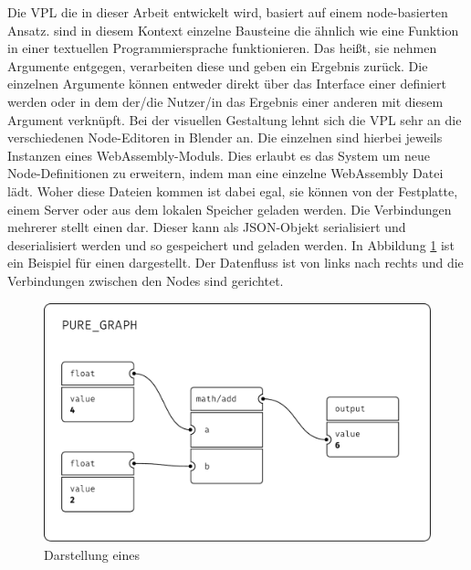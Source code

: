 \documentclass[ngerman]{article}
\begin{document}
Die VPL die in dieser Arbeit entwickelt wird, basiert auf einem node-basierten Ansatz. 
 sind in diesem Kontext einzelne Bausteine die ähnlich wie eine Funktion in einer textuellen Programmiersprache funktionieren.
Das heißt, sie nehmen Argumente entgegen, verarbeiten diese und geben ein Ergebnis zurück.
\br
Die einzelnen Argumente können entweder direkt über das Interface einer  definiert werden oder in dem der/die Nutzer/in das Ergebnis einer anderen  mit diesem Argument verknüpft.
Bei der visuellen Gestaltung lehnt sich die VPL sehr an die verschiedenen Node-Editoren in Blender an.
\br
Die einzelnen  sind hierbei jeweils Instanzen eines WebAssembly-Moduls. 
Dies erlaubt es das System um neue Node-Definitionen zu erweitern, indem man eine einzelne WebAssembly Datei lädt.
Woher diese Dateien kommen ist dabei egal, sie können von der Festplatte, einem Server oder aus dem lokalen Speicher geladen werden.
\br
Die Verbindungen mehrerer  stellt einen  dar. 
Dieser  kann als JSON-Objekt serialisiert und deserialisiert werden und so gespeichert und geladen werden.
\br
In Abbildung \ref{sec:PURE_GRAPH} ist ein Beispiel für einen  dargestellt. 
Der Datenfluss ist von links nach rechts und die Verbindungen zwischen den Nodes sind gerichtet.


\begin{figure}[htbp]
    \centering
    \begin{minipage}[b]{0.8\textwidth}
        \centering
        \includegraphics[width=\textwidth]{graphics/PURE_GRAPH.pdf}
        \caption{Darstellung eines }
        \label{sec:PURE_GRAPH}
    \end{minipage}
\end{figure}
\end{document}

